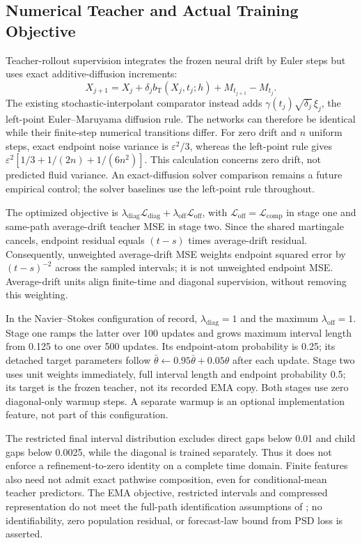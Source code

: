 \subsection{Numerical Teacher and Actual Training Objective}
\label{app:numerical-teacher}
Teacher-rollout supervision integrates the frozen neural drift by Euler steps but uses exact additive-diffusion increments:
\begin{equation}
X_{j+1}=X_j+\delta_j b_{\mathrm T}(X_j,t_j;h)
+M_{t_{j+1}}-M_{t_j}.
\label{eq:numerical-teacher}
\end{equation}
The existing stochastic-interpolant comparator instead adds $\gamma(t_j)\sqrt{\delta_j}\,\xi_j$, the left-point Euler--Maruyama diffusion rule. The networks can therefore be identical while their finite-step numerical transitions differ. For zero drift and $n$ uniform steps, exact endpoint noise variance is $\varepsilon^2/3$, whereas the left-point rule gives $\varepsilon^2[1/3+1/(2n)+1/(6n^2)]$. This calculation concerns zero drift, not predicted fluid variance. An exact-diffusion solver comparison remains a future empirical control; the solver baselines use the left-point rule throughout.

The optimized objective is $\lambda_{\mathrm{diag}}\mathcal L_{\mathrm{diag}}+\lambda_{\mathrm{off}}\mathcal L_{\mathrm{off}}$, with $\mathcal L_{\mathrm{off}}=\mathcal L_{\mathrm{comp}}$ in stage one and same-path average-drift teacher MSE in stage two. Since the shared martingale cancels, endpoint residual equals $(t-s)$ times average-drift residual. Consequently, unweighted average-drift MSE weights endpoint squared error by $(t-s)^{-2}$ across the sampled intervals; it is not unweighted endpoint MSE. Average-drift units align finite-time and diagonal supervision, without removing this weighting.

In the Navier--Stokes configuration of record, $\lambda_{\mathrm{diag}}=1$ and the maximum $\lambda_{\mathrm{off}}=1$. Stage one ramps the latter over 100 updates and grows maximum interval length from 0.125 to one over 500 updates. Its endpoint-atom probability is 0.25; its detached target parameters follow $\bar\theta\leftarrow0.95\bar\theta+0.05\theta$ after each update. Stage two uses unit weights immediately, full interval length and endpoint probability 0.5; its target is the frozen teacher, not its recorded EMA copy. Both stages use zero diagonal-only warmup steps. A separate warmup is an optional implementation feature, not part of this configuration.

The restricted final interval distribution excludes direct gaps below 0.01 and child gaps below 0.0025, while the diagonal is trained separately. Thus it does not enforce a refinement-to-zero identity on a complete time domain. Finite features also need not admit exact pathwise composition, even for conditional-mean teacher predictors. The EMA objective, restricted intervals and compressed representation do not meet the full-path identification assumptions of \citet{pan2026itomaps}; no identifiability, zero population residual, or forecast-law bound from PSD loss is asserted.

